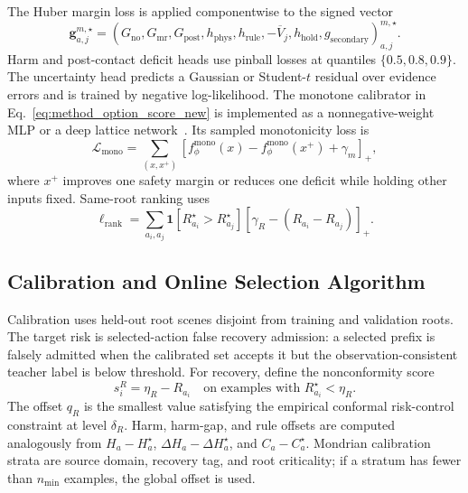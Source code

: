 \documentclass[conference]{IEEEtran}
\begin{document}
The Huber margin loss is applied componentwise to the signed vector
\begin{equation}
\label{eq:app_margin_vector_new}
    \bm g_{a,j}^{m,\star}=(G_{\mathrm{no}},G_{\mathrm{mr}},G_{\mathrm{post}},h_{\mathrm{phys}},h_{\mathrm{rule}},-\overline V_j,h_{\mathrm{hold}},g_{\mathrm{secondary}})_{a,j}^{m,\star}.
\end{equation}
Harm and post-contact deficit heads use pinball losses at quantiles $\{0.5,0.8,0.9\}$.  The uncertainty head predicts a Gaussian or Student-$t$ residual over evidence errors and is trained by negative log-likelihood.  The monotone calibrator in Eq.~\eqref{eq:method_option_score_new} is implemented as a nonnegative-weight MLP or a deep lattice network~\cite{you2017deep}.  Its sampled monotonicity loss is
\begin{equation}
\label{eq:app_mono_loss_new}
    \mathcal L_{\mathrm{mono}}=
    \sum_{(x,x^+)}[f_\phi^{\mathrm{mono}}(x)-f_\phi^{\mathrm{mono}}(x^+)+\gamma_m]_+,
\end{equation}
where $x^+$ improves one safety margin or reduces one deficit while holding other inputs fixed.  Same-root ranking uses
\begin{equation}
\label{eq:app_rank_loss_new}
    \ell_{\mathrm{rank}}=
    \sum_{a_i,a_j}\mathbf 1[R_{a_i}^\star>R_{a_j}^\star]
    [\gamma_R-(R_{a_i}-R_{a_j})]_+.
\end{equation}

\subsection{Calibration and Online Selection Algorithm}
\label{app:calibration_selector_new}

Calibration uses held-out root scenes disjoint from training and validation roots.  The target risk is selected-action false recovery admission: a selected prefix is falsely admitted when the calibrated set accepts it but the observation-consistent teacher label is below threshold.  For recovery, define the nonconformity score
\begin{equation}
\label{eq:app_nonconf_recovery_new}
    s_i^R=\eta_R-R_{a_i}\quad\text{on examples with }R_{a_i}^\star<\eta_R.
\end{equation}
The offset $q_R$ is the smallest value satisfying the empirical conformal risk-control constraint at level $\delta_R$.  Harm, harm-gap, and rule offsets are computed analogously from $H_a-H_a^\star$, $\Delta H_a-\Delta H_a^\star$, and $C_a-C_a^\star$.  Mondrian calibration strata are source domain, recovery tag, and root criticality; if a stratum has fewer than $n_{\min}$ examples, the global offset is used.
\end{document}
